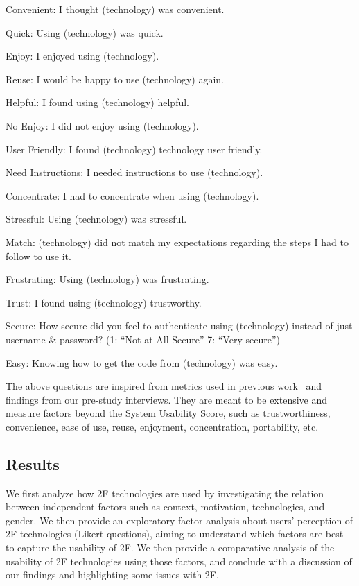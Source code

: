 \documentclass[conference]{IEEEtran}
\begin{document}
\begin{compactitem}
\item \textsf{\small Convenient}: I thought (technology) was convenient.
\item \textsf{\small Quick}: Using (technology) was quick.
\item \textsf{\small Enjoy}: I enjoyed using (technology). 
\item \textsf{\small Reuse}: I would be happy to use (technology) again. 
\item \textsf{\small Helpful}: I found using (technology) helpful. 
\item \textsf{\small No Enjoy}: I did not enjoy using (technology). 
\item \textsf{\small User Friendly}: I found (technology) technology user friendly. 
\item \textsf{\small Need Instructions}: I needed instructions to use (technology). 
\item \textsf{\small Concentrate}: I had to concentrate when using (technology). 
\item \textsf{\small Stressful}: Using (technology) was stressful. 
\item \textsf{\small Match}: (technology) did not match my expectations regarding the steps I had to follow to use it. 
\item \textsf{\small Frustrating}: Using (technology) was frustrating. 
\item \textsf{\small Trust}: I found using (technology) trustworthy. 
\item \textsf{\small Secure}: How secure did you feel to authenticate using (technology) instead of just username \& password? (1: ``Not at All Secure'' 7: ``Very secure'')
\item \textsf{\small Easy}: Knowing how to get the code from (technology) was easy. 
\end{compactitem}

The above questions are inspired from metrics used in previous work~\cite{bonneau2012quest,karole2011comparative} and findings from our pre-study interviews. They are meant to be extensive and measure factors beyond the System Usability Score, such as trustworthiness, convenience, ease of use, reuse, enjoyment, concentration, portability, etc. 


\subsection{Results}
We first analyze how 2F technologies are used by investigating the relation between independent factors such as context, motivation, technologies, and gender. We then provide an exploratory factor analysis about users' perception of 2F technologies (Likert questions), aiming to understand which factors are best to capture the usability of 2F. We then provide a comparative analysis of the usability of 2F technologies using those factors, and conclude with a discussion of our findings and highlighting some issues with 2F. 
\end{document}
